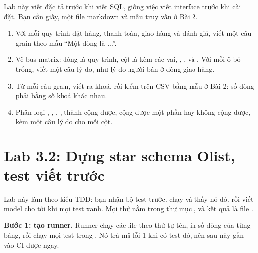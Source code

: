 Lab này viết đặc tả trước khi viết SQL, giống việc viết interface trước khi cài đặt. Bạn cần giấy, một file markdown và mẫu truy vấn ở Bài 2.

\begin{enumerate}
  \item Với mỗi quy trình đặt hàng, thanh toán, giao hàng và đánh giá, viết một câu grain theo mẫu ``Một dòng là ...''.
  \item Vẽ bus matrix: dòng là quy trình, cột là  kèm các vai, , ,  và . Với mỗi ô bỏ trống, viết một câu lý do, như lý do người bán ở dòng giao hàng.
  \item Từ mỗi câu grain, viết ra khoá, rồi kiểm trên CSV bằng mẫu ở Bài 2: số dòng phải bằng số khoá khác nhau.
  \item Phân loại , , , ,  thành cộng được, cộng được một phần hay không cộng được, kèm một câu lý do cho mỗi cột.
\end{enumerate}


\section{Lab 3.2: Dựng star schema Olist, test viết trước}

Lab này làm theo kiểu TDD: bạn nhận bộ test trước, chạy và thấy nó đỏ, rồi viết model cho tới khi mọi test xanh. Mọi thứ nằm trong thư mục , và kết quả là file .

\textbf{Bước 1: tạo runner.} Runner chạy các file  theo thứ tự tên, in số dòng của từng bảng, rồi chạy mọi test trong . Nó trả mã lỗi 1 khi có test đỏ, nên sau này gắn vào CI được ngay.

